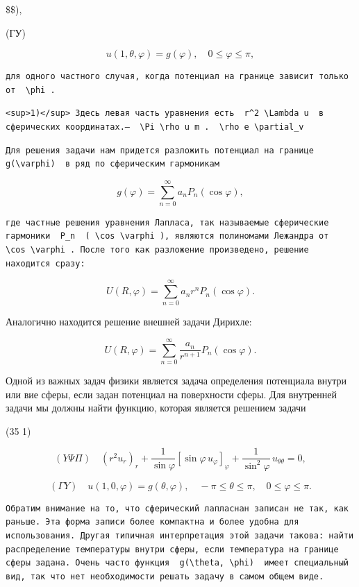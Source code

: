 \documentclass[
  ukrainian,
]{article}
\begin{document}
\$\$),

(ГУ)

\[
u(1, \theta, \varphi) = g(\varphi), \quad 0 \le \varphi \le \pi,
\]

\begin{verbatim}
для одного частного случая, когда потенциал на границе зависит только от  \phi .
\end{verbatim}

\begin{verbatim}
<sup>1)</sup> Здесь левая часть уравнения есть  r^2 \Lambda u  в сферических координатах.—  \Pi \rho u m .  \rho e \partial_v
\end{verbatim}

\begin{verbatim}
Для решения задачи нам придется разложить потенциал на границе  g(\varphi)  в ряд по сферическим гармоникам
\end{verbatim}

\[
g(\varphi) = \sum_{n=0}^{\infty} a_n P_n(\cos \varphi),
\]

\begin{verbatim}
где частные решения уравнения Лапласа, так называемые сферические гармоники  P_n  ( \cos \varphi ), являются полиномами Лежандра от  \cos \varphi . После того как разложение произведено, решение находится сразу:
\end{verbatim}

\[
U(R, \varphi) = \sum_{n=0}^{\infty} a_n r^n P_n(\cos \varphi).
\]

Аналогично находится решение внешней задачи Дирихле:

\[
U(R, \varphi) = \sum_{n=0}^{\infty} \frac{a_n}{r^{n+1}} P_n(\cos \varphi).
\]

Одной из важных задач физики является задача определения потенциала
внутри или вие сферы, если задан потенциал на поверхности сферы. Для
внутренней задачи мы должны найти функцию, которая является решением
задачи

(35 1)

\[
(Y \Psi \Pi) \quad (r^2 u_r)_r + \frac{1}{\sin \varphi} [\sin \varphi \, u_\varphi]_\varphi + \frac{1}{\sin^2 \varphi} \, u_{\theta\theta} = 0,
\]

\[
(\Gamma Y) \quad u(1, 0, \varphi) = g(\theta, \varphi), \quad -\pi \leqslant \theta \leqslant \pi, \quad 0 \leqslant \varphi \leqslant \pi.
\]

\begin{verbatim}
Обратим внимание на то, что сферический лапласнан записан не так, как раньше. Эта форма записи более компактна и более удобна для использования. Другая типичная интерпретация этой задачи такова: найти распределение температуры внутри сферы, если температура на границе сферы задана. Очень часто функция  g(\theta, \phi)  имеет специальный вид, так что нет необходимости решать задачу в самом общем виде.
\end{verbatim}
\end{document}
